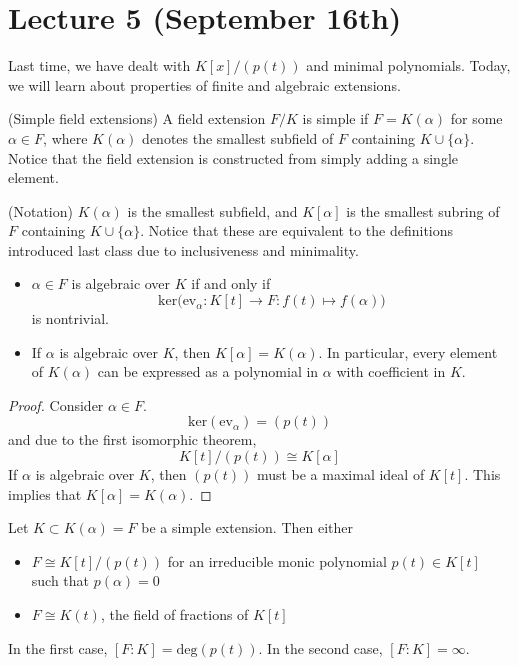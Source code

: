 \section{Lecture 5 (September 16th)}
\begin{recall}
Last time, we have dealt with $K[x]/(p(t))$ and minimal polynomials. Today, we will learn about properties of finite and algebraic extensions.
\end{recall}
\vspace{2ex}
\begin{defi}
(Simple field extensions) A field extension $F/K$ is simple if $F=K(\alpha )$ for some $\alpha \in F$, where $K(\alpha )$ denotes the smallest subfield of $F$ containing $K\cup \{\alpha \}$. Notice that the field extension is constructed from simply adding a single element. 
\end{defi}
\vspace{2ex}
\begin{rmk}
(Notation) $K(\alpha )$ is the smallest subfield, and $K[\alpha ]$ is the smallest subring of $F$ containing $K\cup \{\alpha \}$. Notice that these are equivalent to the definitions introduced last class due to inclusiveness and minimality.
\end{rmk}
\vspace{2ex}
\begin{rmk}
\begin{itemize}
\item[(i)] $\alpha \in F$ is algebraic over $K$ if and only if
\[\mathrm{ker}\Big(\mathrm{ev}_{\alpha }:K[t]\rightarrow F:f(t)\mapsto f(\alpha )\Big)\] 
is nontrivial.
\item[(ii)] If $\alpha $ is algebraic over $K$, then $K[\alpha ]=K(\alpha )$. In particular, every element of $K(\alpha )$ can be expressed as a polynomial in $\alpha $ with coefficient in $K$.	
\end{itemize}
\end{rmk}
\vspace{2ex}
\begin{proof}
Consider $\alpha \in F$. 
\[\mathrm{ker}(\mathrm{ev}_{\alpha })=(p(t))\]
and due to the first isomorphic theorem,
\[K[t]/(p(t))\cong K[\alpha ]\]
If $\alpha $ is algebraic over $K$, then $(p(t))$ must be a maximal ideal of $K[t]$. This implies that $K[\alpha ]=K(\alpha )$.
\end{proof}
\vspace{2ex}
\begin{prop}
Let $K\subset K(\alpha )=F$ be a simple extension. Then either
\begin{itemize}
\item[(i)] $F\cong K[t]/(p(t))$ for an irreducible monic polynomial $p(t)\in K[t]$ such that $p(\alpha )=0$
\item[(ii)] $F\cong K(t)$, the field of fractions of $K[t]$
\end{itemize}
In the first case, $[F:K]=\mathrm{deg}(p(t))$. In the second case, $[F:K]=\infty $. 
\end{prop}
